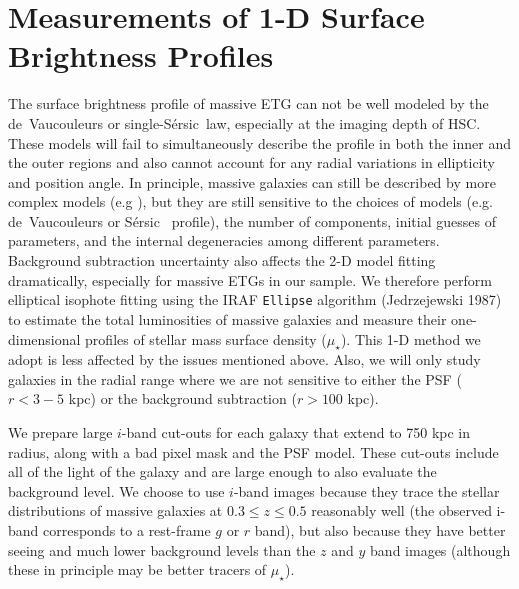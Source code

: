 \documentclass[a4paper,fleqn,usenatbib]{mnras}
\def\ser{{S\'{e}rsic\ }}
\def\mden{{$\mu_{\star}$}}
\begin{document}
\section{Measurements of 1-D Surface Brightness Profiles}
    \label{sec:ellipse}
    
    The surface brightness profile of massive ETG can not be well modeled by the 
    de~Vaucouleurs or single-\ser law, especially at the imaging depth of HSC.
    These models will fail to simultaneously describe the profile in both the inner 
    and the outer regions and also cannot account for any radial variations in 
    ellipticity and position angle. 
    In principle, massive galaxies can still be described by more complex 
    models (e.g \citealt{Huang2013a, Huang2013b, Oh2017}), but they are still 
    sensitive to the choices of models (e.g. de~Vaucouleurs or \ser{} profile), 
    the number of components, initial guesses of parameters, and the internal 
    degeneracies among different parameters. 
    Background subtraction uncertainty also affects the 2-D model fitting 
    dramatically, especially for massive ETGs in our sample. 
    We therefore perform elliptical isophote fitting using the IRAF \texttt{Ellipse} 
    algorithm (Jedrzejewski 1987) to estimate the total luminosities of massive 
    galaxies and measure their one-dimensional profiles of stellar mass surface 
    density (\mden{}). 
    This 1-D method we adopt is less affected by the issues mentioned above. 
    Also, we will only study galaxies in the radial range where we are not 
    sensitive to either the PSF ($r<3-5$ kpc) or the background subtraction 
    ($r>100$ kpc). 
        
    We prepare large $i$-band cut-outs for each galaxy that extend to 750 kpc in 
    radius, along with a bad pixel mask and the PSF model. 
    These cut-outs include all of the light of the galaxy and are large enough to 
    also evaluate the background level. 
    We choose to use $i$-band images because they trace the stellar distributions of 
    massive galaxies at $0.3 \leq z \leq 0.5$ reasonably well 
    (the observed i-band corresponds to a rest-frame $g$ or $r$ band), but also 
    because they have better seeing and much lower background levels than the $z$ 
    and $y$ band images (although these in principle may be better tracers of 
    \mden{}). 
    
\end{document}
